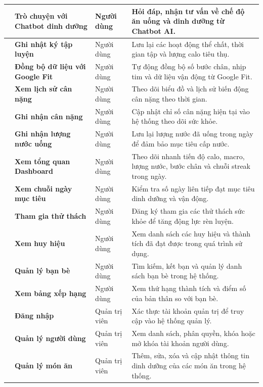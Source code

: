\documentclass[../main.tex]{subfiles}
\begin{document}
\begin{longtable}{|>{\centering\arraybackslash}p{}|>{\raggedright\arraybackslash}p{}|>{\raggedright\arraybackslash}p{}|>{\raggedright\arraybackslash}p{}|}
    \hline
    11 & \textbf{Trò chuyện với Chatbot dinh dưỡng} & Người dùng & Hỏi đáp, nhận tư vấn về chế độ ăn uống và dinh dưỡng từ Chatbot AI. \\
    \hline
    12 & \textbf{Ghi nhật ký tập luyện} & Người dùng & Lưu lại các hoạt động thể chất, thời gian tập và lượng calo tiêu thụ. \\
    \hline
    13 & \textbf{Đồng bộ dữ liệu với Google Fit} & Người dùng & Tự động đồng bộ số bước chân, nhịp tim và dữ liệu vận động từ Google Fit. \\
    \hline
    14 & \textbf{Xem lịch sử cân nặng} & Người dùng & Theo dõi biểu đồ và lịch sử biến động cân nặng theo thời gian. \\
    \hline
    15 & \textbf{Ghi nhận cân nặng} & Người dùng & Cập nhật chỉ số cân nặng hiện tại vào hệ thống theo dõi sức khỏe. \\
    \hline
    16 & \textbf{Ghi nhận lượng nước uống} & Người dùng & Lưu lại lượng nước đã uống trong ngày để đảm bảo mục tiêu cấp nước. \\
    \hline
    17 & \textbf{Xem tổng quan Dashboard} & Người dùng & Theo dõi nhanh tiến độ calo, macro, lượng nước, bước chân và chuỗi streak trong ngày. \\
    \hline
    18 & \textbf{Xem chuỗi ngày mục tiêu} & Người dùng & Kiểm tra số ngày liên tiếp đạt mục tiêu dinh dưỡng và vận động. \\
    \hline
    19 & \textbf{Tham gia thử thách} & Người dùng & Đăng ký tham gia các thử thách sức khỏe để tăng động lực rèn luyện. \\
    \hline
    20 & \textbf{Xem huy hiệu} & Người dùng & Xem danh sách các huy hiệu và thành tích đã đạt được trong quá trình sử dụng. \\
    \hline
    21 & \textbf{Quản lý bạn bè} & Người dùng & Tìm kiếm, kết bạn và quản lý danh sách bạn bè trong hệ thống. \\
    \hline
    22 & \textbf{Xem bảng xếp hạng} & Người dùng & Xem thứ hạng thành tích và điểm số của bản thân so với bạn bè. \\
    \hline
    23 & \textbf{Đăng nhập} & Quản trị viên & Xác thực tài khoản quản trị để truy cập vào hệ thống quản lý. \\
    \hline
    24 & \textbf{Quản lý người dùng} & Quản trị viên & Xem danh sách, phân quyền, khóa hoặc mở khóa tài khoản người dùng. \\
    \hline
    25 & \textbf{Quản lý món ăn} & Quản trị viên & Thêm, sửa, xóa và cập nhật thông tin dinh dưỡng của các món ăn trong hệ thống. \\

\end{longtable}
\end{document}

